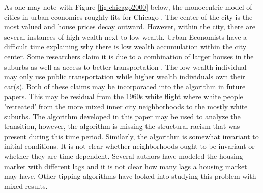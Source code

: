 {As one may note with Figure \ref{fig:chicago2000} below, the monocentric model of cities in urban economics roughly fits for Chicago \cite{brueckner87}. The center of the city is the most valued and house prices decay outward. However, within the city, there are several instances of high wealth next to low wealth. Urban Economists have a difficult time explaining why there is low wealth accumulation within the city center. Some researchers claim it is due to a combination of larger houses in the suburbs as well as access to better transportation \cite{glaeser08a}. The low wealth individual may only use public transportation while higher wealth individuals own their car(s). Both of these claims may be incorporated into the algorithm in future papers. This may be residual from the 1960s white flight where white people 'retreated' from the more mixed inner city neighborhoods to the mostly white suburbs. The algorithm developed in this paper may be used to analyze the transition, however, the algorithm is missing the structural racism that was present during this time period\cite{cutler97, cutler99}. Similarly, the algorithm is somewhat invariant to initial conditions\cite{zhang11}. It is not clear whether neighborhoods ought to be invariant or whether they are time dependent. Several authors have modeled the housing market with different lags and it is not clear how many lags a housing market may have\cite{glaeser07}. Other tipping algorithms have looked into studying this problem with mixed results\cite{card07}.

}
